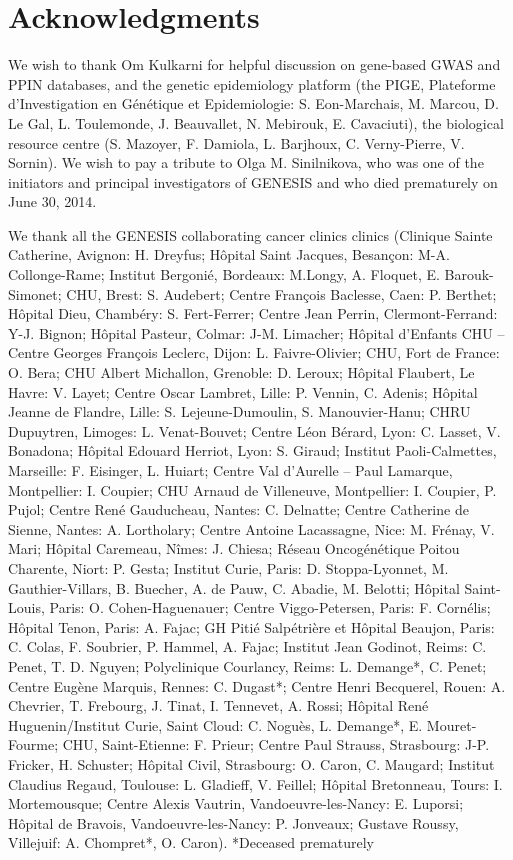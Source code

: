 \documentclass[10pt,letterpaper]{article}
\begin{document}
\section*{Acknowledgments}

We wish to thank Om Kulkarni for helpful discussion on gene-based GWAS and PPIN databases, and the genetic epidemiology platform (the PIGE, Plateforme d'Investigation en Génétique et Epidemiologie: S. Eon-Marchais, M. Marcou, D. Le Gal, L. Toulemonde, J. Beauvallet, N. Mebirouk, E. Cavaciuti), the biological resource centre (S. Mazoyer, F. Damiola, L. Barjhoux, C. Verny-Pierre, V. Sornin). We wish to pay a tribute to Olga M. Sinilnikova, who was one of the initiators and principal investigators of GENESIS and who died prematurely on June 30, 2014.

We thank all the GENESIS collaborating cancer clinics clinics (Clinique Sainte Catherine, Avignon: H. Dreyfus; Hôpital Saint Jacques, Besançon: M-A. Collonge-Rame; Institut Bergonié, Bordeaux: M.Longy, A. Floquet, E. Barouk-Simonet; CHU, Brest: S. Audebert; Centre François Baclesse, Caen: P. Berthet; Hôpital Dieu, Chambéry: S. Fert-Ferrer; Centre Jean Perrin, Clermont-Ferrand: Y-J. Bignon; Hôpital Pasteur, Colmar: J-M. Limacher; Hôpital d’Enfants CHU – Centre Georges François Leclerc, Dijon: L. Faivre-Olivier; CHU, Fort de France: O. Bera; CHU Albert Michallon, Grenoble: D. Leroux; Hôpital Flaubert, Le Havre: V. Layet; Centre Oscar Lambret, Lille: P. Vennin, C. Adenis; Hôpital Jeanne de Flandre, Lille: S. Lejeune-Dumoulin, S. Manouvier-Hanu; CHRU Dupuytren, Limoges: L. Venat-Bouvet; Centre Léon Bérard, Lyon: C. Lasset, V. Bonadona; Hôpital Edouard Herriot, Lyon: S. Giraud; Institut Paoli-Calmettes, Marseille: F. Eisinger, L. Huiart; Centre Val d’Aurelle – Paul Lamarque, Montpellier: I. Coupier; CHU Arnaud de Villeneuve, Montpellier: I. Coupier, P. Pujol; Centre René Gauducheau, Nantes: C. Delnatte; Centre Catherine de Sienne, Nantes: A. Lortholary; Centre Antoine Lacassagne, Nice: M. Frénay, V. Mari; Hôpital Caremeau, Nîmes: J. Chiesa; Réseau Oncogénétique Poitou Charente, Niort: P. Gesta; Institut Curie, Paris: D. Stoppa-Lyonnet, M. Gauthier-Villars, B. Buecher, A. de Pauw, C. Abadie, M. Belotti; Hôpital Saint-Louis, Paris: O. Cohen-Haguenauer; Centre Viggo-Petersen, Paris: F. Cornélis; Hôpital Tenon, Paris: A. Fajac; GH Pitié Salpétrière et Hôpital Beaujon, Paris: C. Colas, F. Soubrier, P. Hammel, A. Fajac; Institut Jean Godinot, Reims: C. Penet, T. D. Nguyen; Polyclinique Courlancy, Reims: L. Demange*, C. Penet; Centre Eugène Marquis, Rennes: C. Dugast*; Centre Henri Becquerel, Rouen: A. Chevrier, T. Frebourg, J. Tinat, I. Tennevet, A. Rossi; Hôpital René Huguenin/Institut Curie, Saint Cloud: C. Noguès, L. Demange*, E. Mouret-Fourme; CHU, Saint-Etienne: F. Prieur; Centre Paul Strauss, Strasbourg: J-P. Fricker, H. Schuster; Hôpital Civil, Strasbourg: O. Caron, C. Maugard; Institut Claudius Regaud, Toulouse: L. Gladieff, V. Feillel; Hôpital Bretonneau, Tours: I. Mortemousque; Centre Alexis Vautrin, Vandoeuvre-les-Nancy: E. Luporsi; Hôpital de Bravois, Vandoeuvre-les-Nancy: P. Jonveaux; Gustave Roussy, Villejuif: A. Chompret*, O. Caron).
*Deceased prematurely
\end{document}
